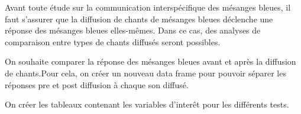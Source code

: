 \documentclass[
  french,
]{article}
\newenvironment{Shaded}{\begin{snugshade}}{\end{snugshade}}
\newcommand{\AttributeTok}[1]{\textcolor[rgb]{0.13,0.29,0.53}{#1}}
\newcommand{\CommentTok}[1]{\textcolor[rgb]{0.56,0.35,0.01}{\textit{#1}}}
\newcommand{\FunctionTok}[1]{\textcolor[rgb]{0.13,0.29,0.53}{\textbf{#1}}}
\newcommand{\NormalTok}[1]{#1}
\newcommand{\OtherTok}[1]{\textcolor[rgb]{0.56,0.35,0.01}{#1}}
\newcommand{\SpecialCharTok}[1]{\textcolor[rgb]{0.81,0.36,0.00}{\textbf{#1}}}
\newcommand{\StringTok}[1]{\textcolor[rgb]{0.31,0.60,0.02}{#1}}
\begin{document}
Avant toute étude sur la communication interspécifique des mésanges
bleues, il faut s'assurer que la diffusion de chants de mésanges bleues
déclenche une réponse des mésanges bleues elles-mêmes. Dans ce cas, des
analyses de comparaison entre types de chants diffusés seront possibles.

On souhaite comparer la réponse des mésanges bleues avant et après la
diffusion de chants.Pour cela, on créer un nouveau data frame pour
pouvoir séparer les réponses pre et post diffusion à chaque son diffusé.

\begin{Shaded}
\end{Shaded}

On créer les tableaux contenant les variables d'interêt pour les
différents tests.
\end{document}
